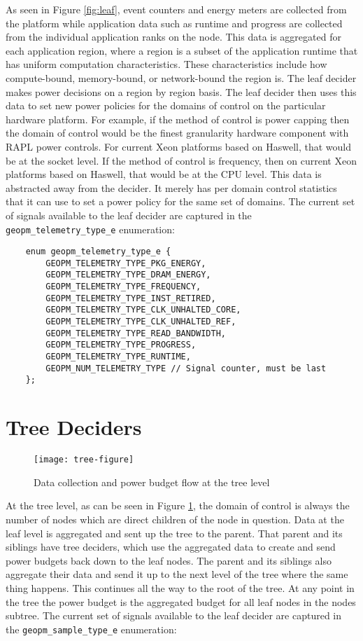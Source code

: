\documentclass[11pt]{article}
\begin{document}
As seen in Figure \ref{fig:leaf}, event counters and energy meters are
collected from the platform while application data such as runtime and
progress are collected from the individual application ranks on the
node. This data is aggregated for each application region, where a
region is a subset of the application runtime that has uniform
computation characteristics. These characteristics include how
compute-bound, memory-bound, or network-bound the region is. The leaf decider
makes power decisions on a region by region basis. The leaf decider
then uses this data to set new power policies for the domains of
control on the particular hardware platform. For example, if the
method of control is power capping then the domain of control would be
the finest granularity hardware component with RAPL power
controls. For current Xeon platforms based on Haswell, that would be
at the socket level. If the method of control is frequency, then on
current Xeon platforms based on Haswell, that would be at the CPU
level. This data is abstracted away from the decider. It merely has
per domain control statistics that it can use to set a power policy
for the same set of domains. The current set of signals available to
the leaf decider are captured in the \verb#geopm_telemetry_type_e#
enumeration:

\begin{verbatim}
    enum geopm_telemetry_type_e {
        GEOPM_TELEMETRY_TYPE_PKG_ENERGY,
        GEOPM_TELEMETRY_TYPE_DRAM_ENERGY,
        GEOPM_TELEMETRY_TYPE_FREQUENCY,
        GEOPM_TELEMETRY_TYPE_INST_RETIRED,
        GEOPM_TELEMETRY_TYPE_CLK_UNHALTED_CORE,
        GEOPM_TELEMETRY_TYPE_CLK_UNHALTED_REF,
        GEOPM_TELEMETRY_TYPE_READ_BANDWIDTH,
        GEOPM_TELEMETRY_TYPE_PROGRESS,
        GEOPM_TELEMETRY_TYPE_RUNTIME,
        GEOPM_NUM_TELEMETRY_TYPE // Signal counter, must be last
    };
\end{verbatim}

\section{Tree Deciders}
\begin{figure} [H]
  \centering
  \texttt{[image: tree-figure]}
  \caption{Data collection and power budget flow at the tree level}
  \label{fig:tree}
\end{figure}

At the tree level, as can be seen in Figure \ref{fig:tree}, the domain
of control is always the number of nodes which are direct children of
the node in question. Data at the leaf level is aggregated and sent up
the tree to the parent. That parent and its siblings have tree
deciders, which use the aggregated data to create and send power
budgets back down to the leaf nodes. The parent and its siblings also
aggregate their data and send it up to the next level of the tree
where the same thing happens. This continues all the way to the root
of the tree. At any point in the tree the power budget is the
aggregated budget for all leaf nodes in the nodes subtree. The current
set of signals available to the leaf decider are captured in the
\verb#geopm_sample_type_e# enumeration:
\end{document}

